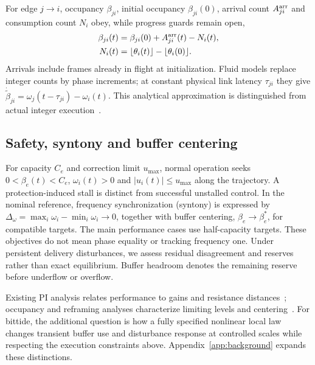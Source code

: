 For edge $j\to i$, occupancy $\beta_{ji}$, initial occupancy
$\beta_{ji}(0)$, arrival count $A_{ji}^{\rm arr}$ and consumption
count $N_i$ obey, while progress guards remain open,
\begin{align}
 \beta_{ji}(t)&=\beta_{ji}(0)+A_{ji}^{\rm arr}(t)-N_i(t),\nonumber\\
 N_i(t)&=\lfloor\theta_i(t)\rfloor-\lfloor\theta_i(0)\rfloor.
 \label{eq:bg_count_balance}
\end{align}
Arrivals include frames already in flight at initialization. Fluid
models replace integer counts by phase increments; at constant physical
link latency $\tau_{ji}$ they give
$\dot{\widetilde\beta}_{ji}=\omega_j(t-\tau_{ji})-\omega_i(t)$.
This analytical approximation is distinguished from actual integer
execution~\cite{lall2022resistance,lall2024bufferOccupancy}.

\subsection{Safety, syntony and buffer centering}
For capacity $C_e$ and correction limit $u_{\max}$, normal operation
seeks $0<\beta_e(t)<C_e$, $\omega_i(t)>0$ and
$|u_i(t)|\le u_{\max}$ along the trajectory. A protection-induced
stall is distinct from successful unstalled control. In the nominal
reference, frequency synchronization (syntony) is expressed by
$\Delta_\omega=\max_i\omega_i-\min_i\omega_i\to0$, together with
buffer centering, $\beta_e\to\beta_e^*$, for compatible targets.
The main performance cases use half-capacity targets. These objectives
do not mean phase equality or tracking frequency one. Under persistent
delivery disturbances, we assess residual disagreement and reserves
rather than exact equilibrium. Buffer headroom denotes the remaining
reserve before underflow or overflow.

Existing PI analysis relates performance to gains and resistance
distances~\cite{lall2022resistance}; occupancy and reframing analyses
characterize limiting levels and centering~\cite{lall2024bufferOccupancy,lall2023bufferCentering}.
For bittide, the additional question is how a fully specified nonlinear
local law changes transient buffer use and disturbance response at
controlled scales while respecting the execution constraints above. Appendix~\ref{app:background} expands these distinctions.
